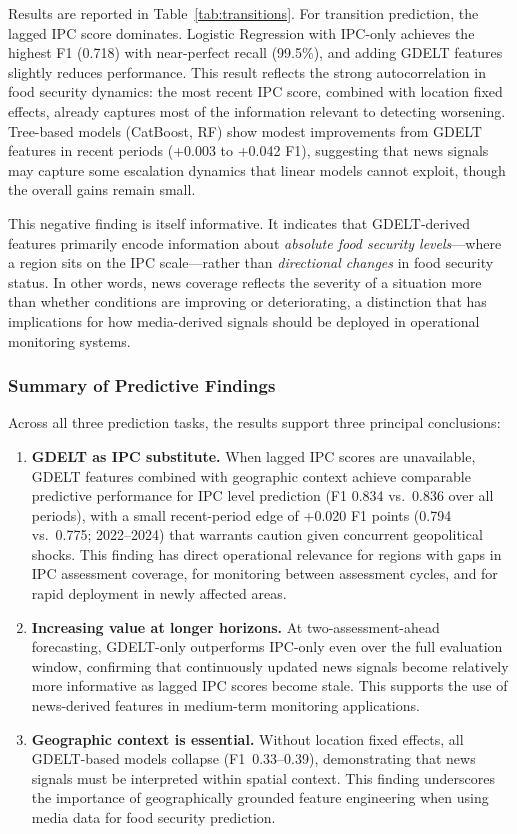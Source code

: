 \documentclass{article}
\begin{document}
Results are reported in Table~\ref{tab:transitions}. For transition prediction, the lagged IPC score dominates. Logistic Regression with IPC-only achieves the highest F1 (0.718) with near-perfect recall (99.5\%), and adding GDELT features slightly reduces performance. This result reflects the strong autocorrelation in food security dynamics: the most recent IPC score, combined with location fixed effects, already captures most of the information relevant to detecting worsening. Tree-based models (CatBoost, RF) show modest improvements from GDELT features in recent periods (+0.003 to +0.042 F1), suggesting that news signals may capture some escalation dynamics that linear models cannot exploit, though the overall gains remain small.

This negative finding is itself informative. It indicates that GDELT-derived features primarily encode information about \textit{absolute food security levels}---where a region sits on the IPC scale---rather than \textit{directional changes} in food security status. In other words, news coverage reflects the severity of a situation more than whether conditions are improving or deteriorating, a distinction that has implications for how media-derived signals should be deployed in operational monitoring systems.

\subsubsection{Summary of Predictive Findings}

Across all three prediction tasks, the results support three principal conclusions:

\begin{enumerate}
    \item \textbf{GDELT as IPC substitute.} When lagged IPC scores are unavailable, GDELT features combined with geographic context achieve comparable predictive performance for IPC level prediction (F1 0.834 vs.\ 0.836 over all periods), with a small recent-period edge of +0.020 F1 points (0.794 vs.\ 0.775; 2022--2024) that warrants caution given concurrent geopolitical shocks. This finding has direct operational relevance for regions with gaps in IPC assessment coverage, for monitoring between assessment cycles, and for rapid deployment in newly affected areas.

    \item \textbf{Increasing value at longer horizons.} At two-assessment-ahead forecasting, GDELT-only outperforms IPC-only even over the full evaluation window, confirming that continuously updated news signals become relatively more informative as lagged IPC scores become stale. This supports the use of news-derived features in medium-term monitoring applications.

    \item \textbf{Geographic context is essential.} Without location fixed effects, all GDELT-based models collapse (F1~0.33--0.39), demonstrating that news signals must be interpreted within spatial context. This finding underscores the importance of geographically grounded feature engineering when using media data for food security prediction.
\end{enumerate}
\end{document}
